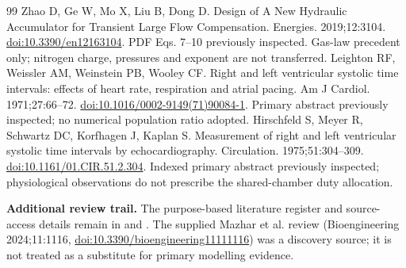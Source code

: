 \documentclass[11pt,a4paper]{article}
\numberwithin{equation}{section}
\begin{document}
\begin{thebibliography}{99}
 Zhao D, Ge W, Mo X, Liu B, Dong D. Design of A New Hydraulic Accumulator for Transient Large Flow Compensation. Energies. 2019;12:3104. \href{https://doi.org/10.3390/en12163104}{doi:10.3390/en12163104}. PDF Eqs. 7--10 previously inspected. Gas-law precedent only; nitrogen charge, pressures and exponent are not transferred.
 Leighton RF, Weissler AM, Weinstein PB, Wooley CF. Right and left ventricular systolic time intervals: effects of heart rate, respiration and atrial pacing. Am J Cardiol. 1971;27:66--72. \href{https://doi.org/10.1016/0002-9149(71)90084-1}{doi:10.1016/0002-9149(71)90084-1}. Primary abstract previously inspected; no numerical population ratio adopted.
 Hirschfeld S, Meyer R, Schwartz DC, Korfhagen J, Kaplan S. Measurement of right and left ventricular systolic time intervals by echocardiography. Circulation. 1975;51:304--309. \href{https://doi.org/10.1161/01.CIR.51.2.304}{doi:10.1161/01.CIR.51.2.304}. Indexed primary abstract previously inspected; physiological observations do not prescribe the shared-chamber duty allocation.
\end{thebibliography}
\textbf{Additional review trail.} The purpose-based literature register and source-access details remain in  and . The supplied Mazhar et al. review (Bioengineering 2024;11:1116, \href{https://doi.org/10.3390/bioengineering11111116}{doi:10.3390/bioengineering11111116}) was a discovery source; it is not treated as a substitute for primary modelling evidence.
\end{document}
